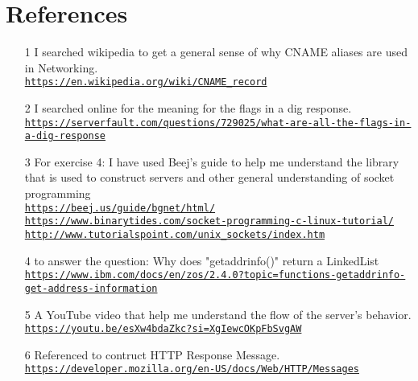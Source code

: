 \documentclass[12pt]{article}
\newcommand{\lil}[1]{\lstinline{#1}}
\begin{document}


\newpage

\section*{References}
\newcommand{\link}[1]{\href{#1}{\lil{#1}}}
\begin{enumerate}
    \item [1] I searched wikipedia to get a general sense of why CNAME aliases 
        are used in Networking. \\
        \link{https://en.wikipedia.org/wiki/CNAME_record}

    \item [2] I searched online for the meaning for the flags in a dig response. \\
        \link{https://serverfault.com/questions/729025/what-are-all-the-flags-in-a-dig-response}

    \item [3] For exercise 4: I have used Beej's guide to help me understand 
        the library that is used to construct servers and other general
        understanding of socket programming\\
        \link{https://beej.us/guide/bgnet/html/}\\
        \link{https://www.binarytides.com/socket-programming-c-linux-tutorial/}\\
        \link{http://www.tutorialspoint.com/unix_sockets/index.htm}

    \item [4] to answer the question: Why does "getaddrinfo()" return a LinkedList \\
        \link{https://www.ibm.com/docs/en/zos/2.4.0?topic=functions-getaddrinfo-get-address-information}

    \item [5] A YouTube video that help me understand the flow of the server's
        behavior. \\
        \link{https://youtu.be/esXw4bdaZkc?si=XgIewcOKpFbSvgAW}

    \item [6] Referenced to contruct HTTP Response Message. \\
        \link{https://developer.mozilla.org/en-US/docs/Web/HTTP/Messages}


\end{enumerate}
\end{document}
